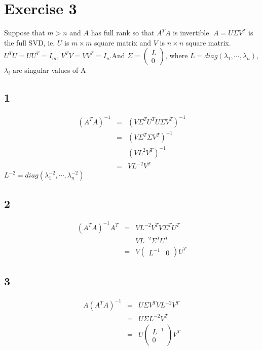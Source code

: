 \documentclass[12pt,a4paper]{article}
\begin{document}
\section*{Exercise 3}
Suppose that $m>n$ and $A$ has full rank so that $A^TA$ is invertible. $A=U\Sigma V^T$ is the full SVD, ie, $U$ is $m\times m$ square matrix and $V$ is $n\times n$ square matrix. $U^TU=UU^T=I_m$, $V^TV=VV^T=I_n$.And $\Sigma=\left(\begin{array}{c}
L\\0
\end{array}\right)$, where $L=diag(\lambda_1,\cdots,\lambda_n)$, $\lambda_i$ are singular values of A
\subsection*{1}
\begin{eqnarray*}
(A^TA)^{-1}&=&(V\Sigma^TU^TU\Sigma V^T)^{-1}\\
&=&(V\Sigma^T\Sigma V^T)^{-1}\\
&=&(VL^2 V^T)^{-1}\\
&=&VL^{-2}V^T
\end{eqnarray*}
$L^{-2}=diag(\lambda_1^{-2},\cdots,\lambda_n^{-2})$
\subsection*{2}
\begin{eqnarray*}
	(A^TA)^{-1}A^T&=&VL^{-2}V^T V\Sigma^TU^T\\
	&=&VL^{-2}\Sigma^TU^T\\
	&=&V\left(\begin{array}{cc}
		L^{-1}&0
	\end{array}\right)U^T
\end{eqnarray*}
\subsection*{3}
\begin{eqnarray*}
	A(A^TA)^{-1}&=&U\Sigma V^T VL^{-2}V^T \\
	&=&U\Sigma L^{-2}V^T\\
	&=&U\left(\begin{array}{c}
		L^{-1}\\0
	\end{array}\right)V^T
\end{eqnarray*}
\end{document}
